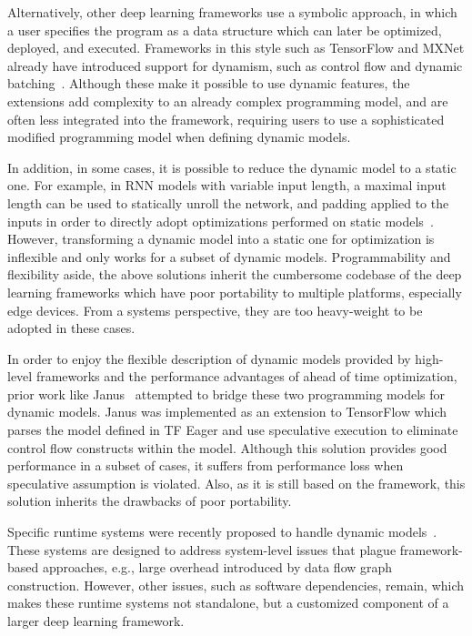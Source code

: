 Alternatively, other deep learning frameworks use a symbolic approach, in which a user specifies the program as a data structure which can later be optimized, deployed, and executed. Frameworks in this style such as TensorFlow and MXNet already have introduced support for dynamism, such as control flow and dynamic batching~\citep{yu2018dynamic, tf_fold, mxnet-control}. Although these make it possible to use dynamic features, the extensions add complexity to an already complex programming model, and are often less integrated into the framework, requiring users to use a sophisticated modified programming model when defining dynamic models.

In addition, in some cases, it is possible to reduce the dynamic model to a static one. For example, in RNN models with variable input length, a maximal input length can be used to statically unroll the network, and padding applied to the inputs in order to directly adopt optimizations performed on static models~\citep{zhang2018deepcpu}. However, transforming a dynamic model into a static one for optimization is inflexible and only works for a subset of dynamic models. Programmability and flexibility aside, the above solutions inherit the cumbersome codebase of the deep learning frameworks which have poor portability to multiple platforms, especially edge devices. From a systems perspective, they are too heavy-weight to be adopted in these cases.

In order to enjoy the flexible description of dynamic models provided by high-level frameworks and the performance advantages of ahead of time optimization, prior work like Janus~\citep{jeong2019janus} attempted to bridge these two programming models for dynamic models.
Janus was implemented as an extension to TensorFlow which parses the model defined in TF Eager and use speculative execution to eliminate control flow constructs within the model.
Although this solution provides good performance in a subset of cases, it suffers from performance loss when speculative assumption is violated.
Also, as it is still based on the framework, this solution inherits the drawbacks of poor portability.

Specific runtime systems were recently proposed to handle dynamic models~\citep{xu2018cavs, gao2018low}. These systems are designed to address system-level issues that plague framework-based approaches, e.g., large overhead introduced by data flow graph construction.
However, other issues, such as software dependencies, remain, which makes these runtime systems not standalone, but a customized component of a larger deep learning framework.

